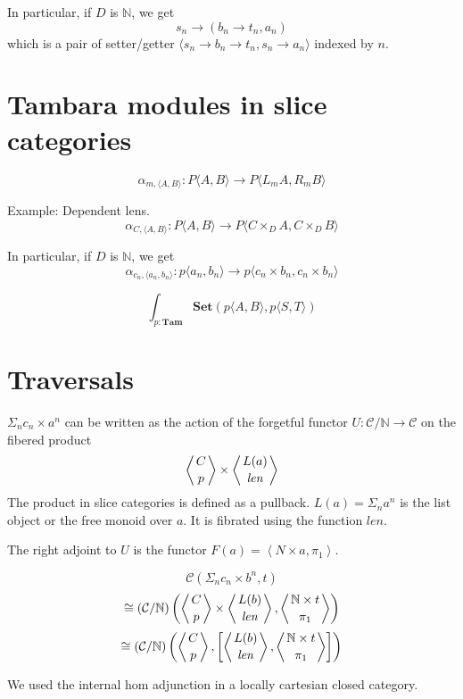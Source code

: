 \documentclass[11pt]{amsart}
\begin{document}
In particular, if $D$ is $\mathbb{N}$, we get
\[s_n \to (b_n \to t_n, a_n) \]
which is a pair of setter/getter $\langle s_n \to b_n \to t_n, s_n \to a_n \rangle$ indexed by $n$.

\section{Tambara modules in slice categories}

\[ \alpha_{m, \langle A, B \rangle} \colon P \langle A, B \rangle \to P\langle L_m A, R_m B \rangle \]

Example: Dependent lens.
\[ \alpha_{C, \langle A, B \rangle} \colon P \langle A, B \rangle \to P\langle C \times_D A, C \times_D B \rangle \]

In particular, if $D$ is $\mathbb{N}$, we get
\[ \alpha_{c_n, \langle a_n, b_n \rangle} \colon p \langle a_n, b_n \rangle \to p\langle c_n \times b_n, c_n \times b_n \rangle \]


\[ \int_{p \colon \mathbf{Tam}} \mathbf{Set}(p \langle A, B \rangle, p \langle S, T \rangle) \]

\section{Traversals}

$\Sigma_n c_n \times a^n$ can be written as the action of the forgetful functor $U \colon \mathcal{C}/\mathbb{N} \to \mathcal{C}$ on the fibered product
\[ \left \langle {C \atop p} \right \rangle \times \left \langle {L(a) \atop \mathit{len}} \right \rangle \]
The product in slice categories is defined as a pullback. $L(a) = \Sigma_n a^n$ is the list object or the free monoid over $a$. It is fibrated using the function $\mathit{len}$.

The right adjoint to $U$ is the functor $F(a) = \left \langle \mathit{N} \times a, \pi_1 \right \rangle$.


\[ \mathcal{C}(\Sigma_n c_n \times b^n, t) \]
\[ \cong  
(\mathcal{C}/\mathbb{N})\left(\left \langle {C \atop p} \right \rangle \times \left \langle {L(b) \atop \mathit{len}} \right \rangle, \left \langle {\mathbb{N} \times t \atop \pi_1} \right \rangle \right) \]
\[ \cong 
(\mathcal{C}/\mathbb{N})\left(\left \langle {C \atop p} \right \rangle, \left[ \left \langle {L(b) \atop \mathit{len}} \right \rangle, \left \langle {\mathbb{N} \times t \atop \pi_1} \right \rangle \right] \right) \]

We used the internal hom adjunction in a locally cartesian closed category.
\end{document}
